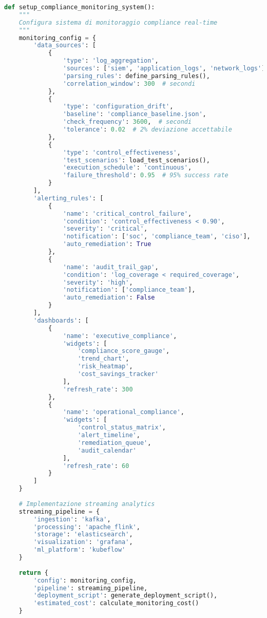 \begin{lstlisting}[language=Python, caption=Sistema monitoraggio compliance real-time]
def setup_compliance_monitoring_system():
    """
    Configura sistema di monitoraggio compliance real-time
    """
    monitoring_config = {
        'data_sources': [
            {
                'type': 'log_aggregation',
                'sources': ['siem', 'application_logs', 'network_logs'],
                'parsing_rules': define_parsing_rules(),
                'correlation_window': 300  # secondi
            },
            {
                'type': 'configuration_drift',
                'baseline': 'compliance_baseline.json',
                'check_frequency': 3600,  # secondi
                'tolerance': 0.02  # 2% deviazione accettabile
            },
            {
                'type': 'control_effectiveness',
                'test_scenarios': load_test_scenarios(),
                'execution_schedule': 'continuous',
                'failure_threshold': 0.95  # 95% success rate
            }
        ],
        'alerting_rules': [
            {
                'name': 'critical_control_failure',
                'condition': 'control_effectiveness < 0.90',
                'severity': 'critical',
                'notification': ['soc', 'compliance_team', 'ciso'],
                'auto_remediation': True
            },
            {
                'name': 'audit_trail_gap',
                'condition': 'log_coverage < required_coverage',
                'severity': 'high',
                'notification': ['compliance_team'],
                'auto_remediation': False
            }
        ],
        'dashboards': [
            {
                'name': 'executive_compliance',
                'widgets': [
                    'compliance_score_gauge',
                    'trend_chart',
                    'risk_heatmap',
                    'cost_savings_tracker'
                ],
                'refresh_rate': 300
            },
            {
                'name': 'operational_compliance',
                'widgets': [
                    'control_status_matrix',
                    'alert_timeline',
                    'remediation_queue',
                    'audit_calendar'
                ],
                'refresh_rate': 60
            }
        ]
    }
    
    # Implementazione streaming analytics
    streaming_pipeline = {
        'ingestion': 'kafka',
        'processing': 'apache_flink',
        'storage': 'elasticsearch',
        'visualization': 'grafana',
        'ml_platform': 'kubeflow'
    }
    
    return {
        'config': monitoring_config,
        'pipeline': streaming_pipeline,
        'deployment_script': generate_deployment_script(),
        'estimated_cost': calculate_monitoring_cost()
    }
\end{lstlisting}

